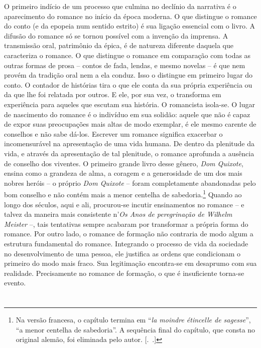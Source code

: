 O primeiro indício de um processo que culmina no declínio da
narrativa é o aparecimento do romance no início da época moderna. O que
distingue o romance do conto (e da epopeia num sentido estrito) é sua
ligação essencial com o livro. A difusão do romance só se tornou
possível com a invenção da imprensa. A transmissão oral, patrimônio da
épica, é de natureza diferente daquela que caracteriza o romance. O que
distingue o romance em comparação com todas as outras formas de prosa --
contos de fada, lendas, e mesmo novelas -- é que nem provém da tradição
oral nem a ela conduz. Isso o distingue em primeiro lugar do conto. O
contador de histórias tira o que ele conta da sua própria experiência ou
da que lhe foi relatada por outros. E ele, por sua vez, o transforma em
experiência para aqueles que escutam sua história. O romancista
isola-se. O lugar de nascimento do romance é o indivíduo em sua solidão:
aquele que não é capaz de expor suas preocupações mais altas de modo
exemplar, é ele mesmo carente de conselhos e não sabe dá-los. Escrever
um romance significa exacerbar o incomensurável na apresentação de uma
vida humana. De dentro da plenitude da vida, e através da apresentação
de tal plenitude, o romance aprofunda a ausência de conselho dos
viventes. O primeiro grande livro desse gênero, \emph{Dom Quixote},
ensina como a grandeza de alma, a coragem e a generosidade de um dos
mais nobres heróis -- o próprio \emph{Dom Quixote} -- foram
completamente abandonadas pelo bom conselho e não contém mais a menor
centelha de sabedoria.\footnote{Na versão francesa, o capítulo termina
  em ``\emph{la moindre étincelle de sagesse}'', ``a menor centelha de
  sabedoria''. A sequência final do capítulo, que consta no original
  alemão, foi eliminada pelo autor. [.~.]} Quando ao longo dos
séculos, aqui e ali, procurou-se incutir ensinamentos no romance -- e
talvez da maneira mais consistente n'\emph{Os Anos de peregrinação de
Wilhelm Meister} --, tais tentativas sempre acabaram por transformar a
própria forma do romance. Por outro lado, o romance de formação não
contraria de modo algum a estrutura fundamental do romance. Integrando o
processo de vida da sociedade no desenvolvimento de uma pessoa, ele
justifica as ordens que condicionam o primeiro do modo mais fraco. Sua
legitimação encontra-se em desaprumo com sua realidade. Precisamente no
romance de formação, o que é insuficiente torna-se evento.

\section{}

